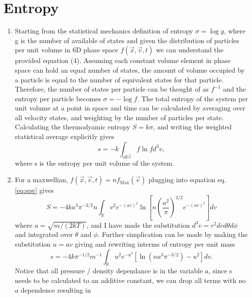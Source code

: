 \documentclass[11pt]{article}
\begin{document}
\section{Entropy}
\label{sec:org98d708c}
\begin{enumerate}[label=\alph*)]
   \item
       Starting from the statistical mechanics definition of entropy $\sigma = \log g$, where g is the number of available of states and given the distribution of particles per unit volume in 6D phase space $f(\vec{x}, \vec{v}, t)$ we can understand the provided equation (4).
       Assuming each constant volume element in phase space can hold an equal number of states, the amount of volume occupied by a particle is equal to the number of equivalent states for that particle.
      Therefore, the number of states per particle can be thought of as $f^{-1}$ and the entropy per particle becomes $\sigma = - \log f$.
      The total entropy of the system per unit volume at a point in space and time can be calculated by averaging over all velocity states, and weighting by the number of particles per state.
      Calculating the thermodyamic entropy $S = k \sigma$, and writing the weighted statistical average explicitly gives
      \begin{equation}\label{eq:spv}
         s = -k \int_{\text{all} \vec{v}} f \ln f d^3 v ,
      \end{equation}
      where s is the entropy per unit volume of the system.
   \item
      For a maxwellian, $f(\vec{x}, \vec{v}, t) = n f_{\text{Max}}(\vec{v})$ plugging into equation eq. \ref{eq:spv} gives
      \begin{equation}
         S = -4 k a^3 \pi^{-3/2} n \int_{\mathbb{R}} v^{2} e^{-(av)^{2}} \ln \left[ n \left(\frac{a^{2}}{\pi}\right)^{3/2} e^{-(av)^{2}}  \right] dv
      \end{equation}
      where $a = \sqrt{m / (2 k T)}$, and I have made the substitution $d^{3}v = r^{2} dr d\theta d\phi$ and integrated over $\theta$ and $\phi$.
      Further simplication can be made by making the substitution $u = av$ giving and rewriting interms of entropy per unit mass
      \begin{equation}
         s = -4 k \pi^{-1/2}m^{-1}  \int_{\mathbb{R}} u^{2} e^{-u^{2}} \left[ \ln \left (n a^{3} \pi^{-3/2} \right) - u^2 \right ] dv .
      \end{equation}
      Notice that all pressure / density dependance is in the variable $a$, since s needs to be calculated to an additive constant, we can drop all terms with no $a$ dependence resulting in

\end{enumerate}
\end{document}
